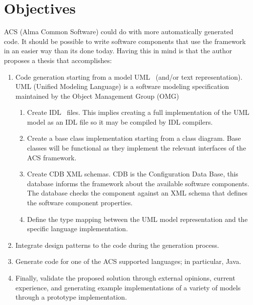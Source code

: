 \section{Objectives}
\label{sec:objectives}
ACS (Alma Common Software) could do with more automatically generated code.
It should be possible to write software components that use the framework
in an easier way than its done today.
Having this in mind is that the author proposes a thesis that accomplishes:
\begin{enumerate}
\item
  Code generation starting from a model
  UML~\cite{UML-WEB}
  (and/or text representation). UML (Unified Modeling Language) is a
  software modeling specification maintained by the Object Management Group (OMG)~%
  \cite{OMG-WEB}
  \begin{enumerate}
     \item Create IDL~\cite{OMG-IDL} files. This implies creating a full implementation of the
     UML model as an IDL file so it may be compiled by IDL compilers.
     \item Create a base class implementation starting from a class diagram.
     Base classes will be functional as they implement the
     relevant interfaces of the ACS framework.
     \item Create CDB XML schemas. CDB is the Configuration Data Base, this database informs
     the framework about the available software components.
     The database checks the component against an XML schema that defines the software
     component properties.
     \item Define the type mapping between the UML model representation
     and the specific language implementation.
  \end{enumerate}
\item
  Integrate design patterns to the code during the generation process.
\item
  Generate code for one of the ACS supported languages;
  in particular, Java.
\item
  Finally,
  validate the proposed solution through external opinions,
  current experience,
  and generating example implementations of a variety of models
  through a prototype implementation.
\end{enumerate}


